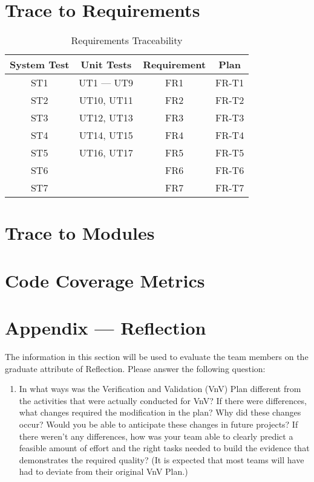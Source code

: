 \documentclass[12pt, titlepage]{article}
\begin{document}
\section{Trace to Requirements}

\begin{table}[H]
	\centering
	\caption{Requirements Traceability}
	\label{my-label}
	\begin{tabular}{|c|c|c|c|}
		\hline
		\textbf{System Test} & \textbf{Unit Tests} & \textbf{Requirement} & \textbf{Plan} \\ \hline
		ST1 & UT1 — UT9 & FR1 &FR-T1 \\ \hline
		ST2 & UT10, UT11 & FR2 &FR-T2\\ \hline
		ST3 & UT12, UT13 & FR3 &FR-T3\\ \hline
		ST4 & UT14, UT15 & FR4 &FR-T4\\ \hline
		ST5 & UT16, UT17 & FR5 &FR-T5\\ \hline
		ST6 &  & FR6 &FR-T6\\ \hline
		ST7 &  & FR7 &FR-T7\\ \hline
	\end{tabular}
\end{table}
		
\section{Trace to Modules}		

\section{Code Coverage Metrics}


%

\newpage{}
\section*{Appendix --- Reflection}

The information in this section will be used to evaluate the team members on the
graduate attribute of Reflection.  Please answer the following question:

\begin{enumerate}
  \item In what ways was the Verification and Validation (VnV) Plan different
  from the activities that were actually conducted for VnV?  If there were
  differences, what changes required the modification in the plan?  Why did
  these changes occur?  Would you be able to anticipate these changes in future
  projects?  If there weren't any differences, how was your team able to clearly
  predict a feasible amount of effort and the right tasks needed to build the
  evidence that demonstrates the required quality?  (It is expected that most
  teams will have had to deviate from their original VnV Plan.)
\end{enumerate}
\end{document}
